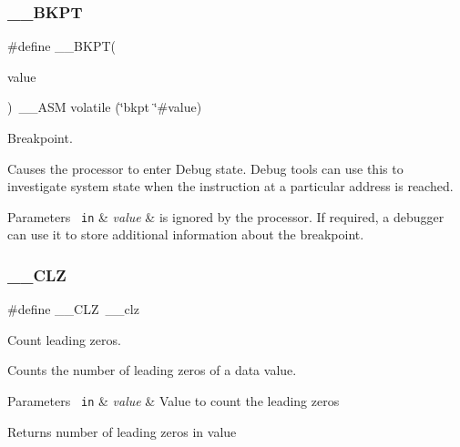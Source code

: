 \subsubsection{\texorpdfstring{\_\_BKPT}{\_\_BKPT}\hspace{0.1cm}{\footnotesize\ttfamily [3/3]}}
{\footnotesize\ttfamily \#define \+\_\+\+\_\+\+B\+K\+PT(\begin{DoxyParamCaption}\item[{}]{value }\end{DoxyParamCaption})~\+\_\+\+\_\+\+A\+SM volatile (\char`\"{}bkpt \char`\"{}\#value)}



Breakpoint. 

Causes the processor to enter Debug state. Debug tools can use this to investigate system state when the instruction at a particular address is reached. 
\begin{DoxyParams}[1]{Parameters}
\mbox{\texttt{ in}}  & {\em value} & is ignored by the processor. If required, a debugger can use it to store additional information about the breakpoint. \\
\hline
\end{DoxyParams}
\mbox{\label{group___c_m_s_i_s___core___instruction_interface_ga5d5bb1527e042be4a9fa5a33f65cc248}} 
\subsubsection{\texorpdfstring{\_\_CLZ}{\_\_CLZ}\hspace{0.1cm}{\footnotesize\ttfamily [1/3]}}
{\footnotesize\ttfamily \#define \+\_\+\+\_\+\+C\+LZ~\+\_\+\+\_\+clz}



Count leading zeros. 

Counts the number of leading zeros of a data value. 
\begin{DoxyParams}[1]{Parameters}
\mbox{\texttt{ in}}  & {\em value} & Value to count the leading zeros \\
\hline
\end{DoxyParams}
\begin{DoxyReturn}{Returns}
number of leading zeros in value 
\end{DoxyReturn}
\mbox{\label{group___c_m_s_i_s___core___instruction_interface_ga5d5bb1527e042be4a9fa5a33f65cc248}} 
